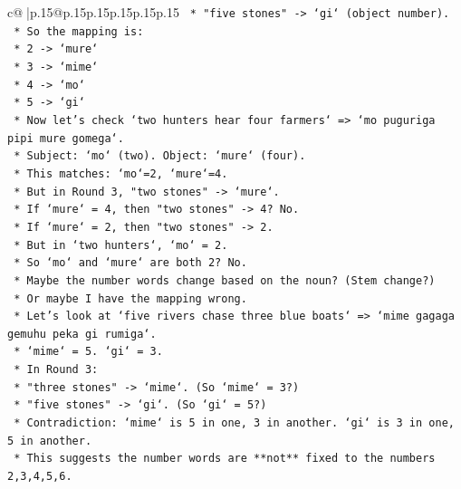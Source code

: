 \documentclass{article}
\begin{document}
{\begin{supertabular}{c@{$\;$}|p{.15\linewidth}@{}p{.15\linewidth}p{.15\linewidth}p{.15\linewidth}p{.15\linewidth}p{.15\linewidth}}
{{{\texttt{                    *   "five stones" {-}> `gi` (object number).} \\
\texttt{                *   So the mapping is:} \\
\texttt{                    *   2 {-}> `mure`} \\
\texttt{                    *   3 {-}> `mime`} \\
\texttt{                    *   4 {-}> `mo`} \\
\texttt{                    *   5 {-}> `gi`} \\
\texttt{                *   Now let's check `two hunters hear four farmers` => `mo puguriga pipi mure gomega`.} \\
\texttt{                    *   Subject: `mo` (two). Object: `mure` (four).} \\
\texttt{                    *   This matches: `mo`=2, `mure`=4.} \\
\texttt{                *   But in Round 3, "two stones" {-}> `mure`.} \\
\texttt{                *   If `mure` = 4, then "two stones" {-}> 4? No.} \\
\texttt{                *   If `mure` = 2, then "two stones" {-}> 2.} \\
\texttt{                *   But in `two hunters`, `mo` = 2.} \\
\texttt{                *   So `mo` and `mure` are both 2? No.} \\
\texttt{                *   Maybe the number words change based on the noun? (Stem change?)} \\
\texttt{                *   Or maybe I have the mapping wrong.} \\
\texttt{                *   Let's look at `five rivers chase three blue boats` => `mime gagaga gemuhu peka gi rumiga`.} \\
\texttt{                    *   `mime` = 5. `gi` = 3.} \\
\texttt{                *   In Round 3:} \\
\texttt{                    *   "three stones" {-}> `mime`. (So `mime` = 3?)} \\
\texttt{                    *   "five stones" {-}> `gi`. (So `gi` = 5?)} \\
\texttt{                *   Contradiction: `mime` is 5 in one, 3 in another. `gi` is 3 in one, 5 in another.} \\
\texttt{                *   This suggests the number words are **not** fixed to the numbers 2,3,4,5,6.} \\
}}}
\end{supertabular}}
\end{document}
